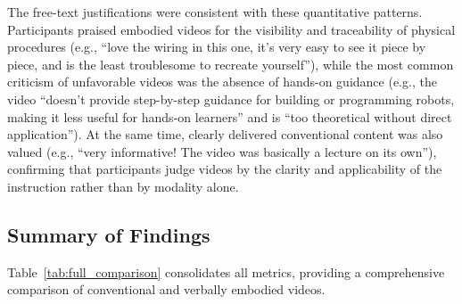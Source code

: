 \documentclass[fleqn,10pt]{JLA_article} %
\begin{document}
The free-text justifications were consistent with these quantitative patterns. Participants praised embodied videos for the visibility and traceability of physical procedures (e.g., ``love the wiring in this one, it's very easy to see it piece by piece, and is the least troublesome to recreate yourself''), while the most common criticism of unfavorable videos was the absence of hands-on guidance (e.g., the video ``doesn't provide step-by-step guidance for building or programming robots, making it less useful for hands-on learners'' and is ``too theoretical without direct application''). At the same time, clearly delivered conventional content was also valued (e.g., ``very informative! The video was basically a lecture on its own''), confirming that participants judge videos by the clarity and applicability of the instruction rather than by modality alone.

\subsection{Summary of Findings}

Table~\ref{tab:full_comparison} consolidates all metrics, providing a comprehensive comparison of conventional and verbally embodied videos.
\end{document}
